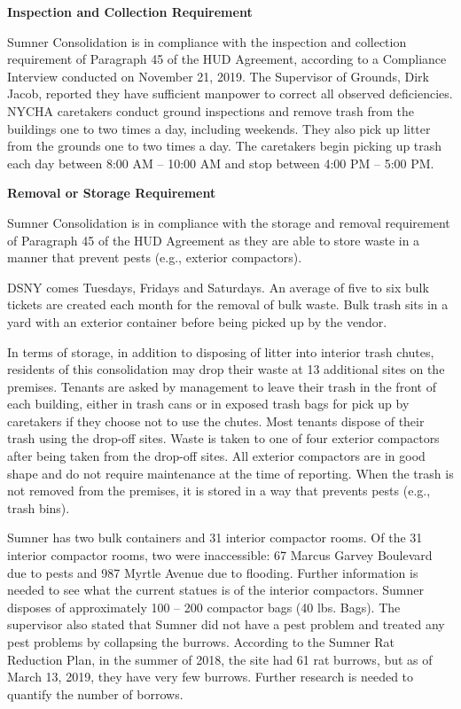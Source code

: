 
\textbf{Inspection and Collection Requirement}

Sumner Consolidation is in compliance with the inspection and collection requirement of  Paragraph 45 of the HUD Agreement, according to a Compliance Interview conducted on November 21, 2019. The Supervisor of Grounds, Dirk Jacob, reported they have sufficient manpower to correct all observed deficiencies. NYCHA caretakers conduct ground inspections and remove trash from the buildings one to two times a day, including weekends. They also pick up litter from the grounds one to two times a day. The caretakers begin picking up trash each day between 8:00 AM -- 10:00 AM and stop between 4:00 PM -- 5:00 PM. 

\textbf{Removal or Storage Requirement}

Sumner Consolidation is in compliance with the storage and removal requirement of Paragraph 45 of the HUD Agreement as they are able to store waste in a manner that prevent pests (e.g., exterior compactors).

 

DSNY comes Tuesdays, Fridays and Saturdays. An average of five to six bulk tickets are created each month for the removal of bulk waste. Bulk trash sits in a yard with an exterior container before being picked up by the vendor.

In terms of storage, in addition to disposing of litter into interior trash chutes, residents of this consolidation may drop their waste at 13 additional sites on the premises. Tenants are asked by management to leave their trash in the front of each building, either in trash cans or in exposed trash bags for pick up by caretakers if they choose not to use the chutes. Most tenants dispose of their trash using the drop-off sites. Waste is taken to one of four exterior compactors after being taken from the drop-off sites. All exterior compactors are in good shape and do not require maintenance at the time of reporting. When the trash is not removed from the premises, it is stored in a way that prevents pests (e.g., trash bins).

Sumner has two bulk containers and 31 interior compactor rooms. Of the 31 interior compactor rooms, two were inaccessible: 67 Marcus Garvey Boulevard due to pests and 987 Myrtle Avenue due to flooding. Further information is needed to see what the current statues is of the interior compactors. Sumner disposes of approximately 100 -- 200 compactor bags (40 lbs. Bags). The supervisor also stated that Sumner did not have a pest problem and treated any pest problems by collapsing the burrows. According to the Sumner Rat Reduction Plan, in the summer of 2018, the site had 61 rat burrows, but as of March 13, 2019, they have very few burrows. Further research is needed to quantify the number of borrows.

